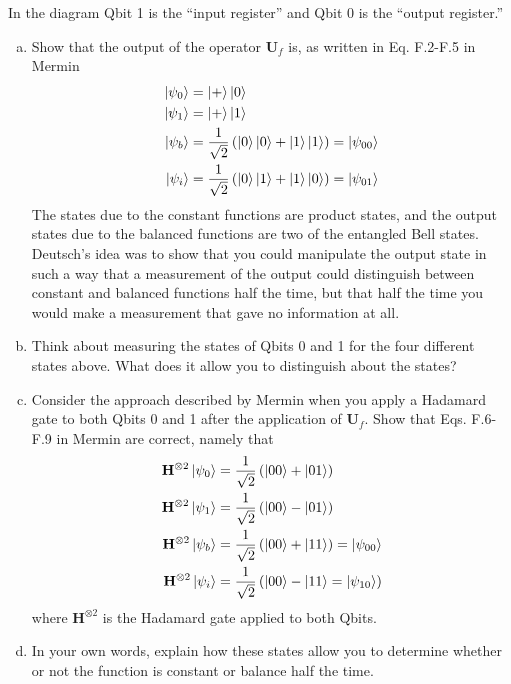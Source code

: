 \documentclass{book}
\theoremstyle{definition}
\newcommand{\nn}{\nonumber}
\newcommand{\f}[2]{\frac{#1}{#2}}
\newcommand{\lp}{\left(}
\newcommand{\rp}{\right)}
\newcommand{\had}{\mathbf{H}}
\begin{document}
\noindent In the diagram Qbit 1 is the ``input register'' and Qbit 0 is the ``output register.''

\begin{enumerate}[(a)]
	\item Show that the output of the operator $\mathbf{U}_f$ is, as written in Eq. F.2-F.5 in Mermin
	\begin{align}
	\ket{\psi_0} &= \ket{+}\ket{0}\nn\\
	\ket{\psi_1} &= \ket{+}\ket{1}\nn\\
	\ket{\psi_b} &= \f{1}{\sqrt{2}}\lp \ket{0}\ket{0} + \ket{1}\ket{1} \rp = \ket{\psi_{00}}\nn\\
	\ket{\psi_i} &= \f{1}{\sqrt{2}}\lp \ket{0}\ket{1} + \ket{1}\ket{0} \rp = \ket{\psi_{01}}
	\end{align}
	The states due to the constant functions are product states, and the output states due to the balanced functions are two of the entangled Bell states. Deutsch’s idea was to show that you could manipulate the output state in such a way that a measurement of the output could distinguish between constant and balanced functions half the time, but that half the time you would make a measurement that gave no information at all.
	
	\item Think about measuring the states of Qbits 0 and 1 for the four different states above. What does it allow you to distinguish about the states?
	
	
	\item Consider the approach described by Mermin when you apply a Hadamard gate to both Qbits 0 and 1 after the application of $\mathbf{U}_f$. Show that Eqs. F.6-F.9 in Mermin are correct, namely that
	\begin{align}
	\had^{\otimes 2}\ket{\psi_0} &= \f{1}{\sqrt{2}}\lp \ket{00} + \ket{01} \rp\nn\\
	\had^{\otimes 2}\ket{\psi_1} &= \f{1}{\sqrt{2}}\lp \ket{00} - \ket{01} \rp\nn\\
	\had^{\otimes 2}\ket{\psi_b} &= \f{1}{\sqrt{2}}\lp \ket{00} + \ket{11} \rp = \ket{\psi_{00}}\nn\\
	\had^{\otimes 2}\ket{\psi_i} &= \f{1}{\sqrt{2}}\lp \ket{00} - \ket{11} = \ket{\psi_{10}} \rp
	\end{align}
	where $\had^{\otimes 2}$ is the Hadamard gate applied to both Qbits. 
	
	
	\item In your own words, explain how these states allow you to determine whether or not the
	function is constant or balance half the time.
	

\end{enumerate}
\end{document}
